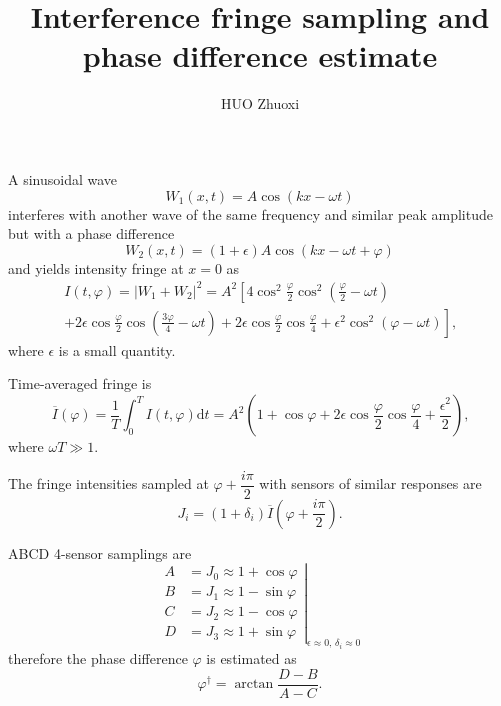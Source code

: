 \documentclass{article}
\begin{document}
\title{Interference fringe sampling and phase difference estimate}
\author{HUO Zhuoxi}
\maketitle
A sinusoidal wave
\begin{equation}
  W_1 \left(x, t\right) = A\cos\left(k x - \omega t\right)
\end{equation}
interferes with another wave of the same frequency and similar peak
amplitude but with a phase difference
\begin{equation}
  W_2 \left(x, t\right) = \left(1+\epsilon\right)A
  \cos\left(k x - \omega t + \varphi\right)
\end{equation}
and yields intensity fringe at $x=0$ as
\begin{multline}
    I\left(t, \varphi\right) = \lvert W_1 + W_2 \rvert^2
      = A^2 \left[ 4\cos^2\frac{\varphi}{2}\cos^2\left(\frac{\varphi}{2} - \omega t\right) \right.\\
      + \left. 2\epsilon\cos\frac{\varphi}{2}\cos\left(\frac{3\varphi}{4} - \omega t\right)
      + 2\epsilon\cos\frac{\varphi}{2}\cos\frac{\varphi}{4}
      + \epsilon^2\cos^2\left(\varphi - \omega t\right)\right] \text{,}
\end{multline}
where $\epsilon$ is a small quantity.

Time-averaged fringe is
\begin{equation}
  \overline{I}\left(\varphi\right) = \frac{1}{T} \int_0^T I\left(t, \varphi\right) \mathrm{d} t =
  A^2\left(1 + \cos\varphi + 2\epsilon\cos\frac{\varphi}{2}\cos\frac{\varphi}{4} + \frac{\epsilon^2}{2}\right)\text{,}
\end{equation}
where $\omega T \gg 1$.

The fringe intensities sampled at $\varphi + \dfrac{i\pi}{2}$ with sensors of similar responses are
\begin{equation}
  J_i = \left(1 + \delta_i \right) \overline{I}\left(\varphi+\frac{i\pi}{2}\right) \text{.}
\end{equation}

ABCD 4-sensor samplings are
\begin{equation}
  \left .
  \begin{aligned}
  A & = J_0 \approx 1 + \cos\varphi \\
  B & = J_1 \approx 1 - \sin\varphi \\
  C & = J_2 \approx 1 - \cos\varphi \\
  D & = J_3 \approx 1 + \sin\varphi
  \end{aligned} \right\vert_{\epsilon \approx 0\text{, }\delta_i \approx 0}
\end{equation}
therefore the phase difference $\varphi$ is estimated as
\begin{equation}
  \varphi^\dagger = \arctan\frac{D-B}{A-C} \text{.}
\end{equation}
\end{document}
